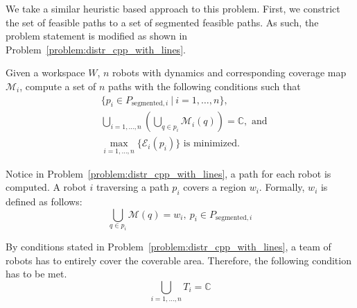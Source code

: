 \documentclass[../main.tex]{subfiles}
\begin{document}
We take a similar heuristic based approach to this problem. First, we constrict the set of feasible paths to a set of segmented feasible paths. As such, the problem statement is modified as shown in Problem~\ref{problem:distr_cpp_with_lines}.

\begin{problem}
\label{problem:distr_cpp_with_lines}
	Given a workspace $W$, $n$ robots with dynamics and corresponding coverage map $\mathcal{M}_i$, compute a set of $n$ paths with the following conditions
such that
	\begin{equation}
	\begin{aligned}
		& \{p_i\in P_{\text{segmented},i}\ |\ i=1,\dots,n\},\\
		& \bigcup_{i=1,\dots,n}(\bigcup_{q\in p_i}\mathcal{M}_i(q))=\mathbb{C},\text{ and}\\
		& \max_{i=1,\ldots,n}\{\mathcal{E}_i(p_i)\}\text{ is minimized.}
	\end{aligned}
	\end{equation}
\end{problem}

Notice in Problem~\ref{problem:distr_cpp_with_lines}, a path for each robot is computed. A robot $i$ traversing a path $p_i$ covers a region $w_i$. Formally, $w_i$ is defined as follows:
\begin{equation}
	\bigcup_{q\in p_i}\mathcal{M}(q) = w_i,\ p_i\in P_{\text{segmented},i}
\end{equation}

By conditions stated in Problem~\ref{problem:distr_cpp_with_lines}, a team of robots has to entirely cover the coverable area. Therefore, the following condition has to be met.
\begin{equation}
	\label{eq:partition_condition}
	\bigcup_{i=1,\ldots,n}T_i=\mathbb{C}
\end{equation}
\end{document}

